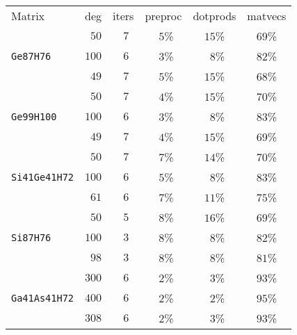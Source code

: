 \begin{tabular}{l|c|c|c|c|c}
\hline
\multirow{2}{*}{Matrix} & \multirow{2}{*}{deg} & \multirow{2}{*}{iters} & \multirow{2}{*}{preproc} & \multirow{2}{*}{dotprods} & \multirow{2}{*}{matvecs} \\
 & & & & & \\\hline
\hline
  & $\phantom{0}50$ & $\phantom{0}7$ & $\phantom{0}5$\% & $15$\% & $69$\%\\
\verb|Ge87H76| & $100$ & $\phantom{0}6$ & $\phantom{0}3$\% & $\phantom{0}8$\% & $82$\%\\
  & $\phantom{0}49$ & $\phantom{0}7$ & $\phantom{0}5$\% & $15$\% & $68$\%\\\hline
  & $\phantom{0}50$ & $\phantom{0}7$ & $\phantom{0}4$\% & $15$\% & $70$\%\\
\verb|Ge99H100| & $100$ & $\phantom{0}6$ & $\phantom{0}3$\% & $\phantom{0}8$\% & $83$\%\\
  & $\phantom{0}49$ & $\phantom{0}7$ & $\phantom{0}4$\% & $15$\% & $69$\%\\\hline
  & $\phantom{0}50$ & $\phantom{0}7$ & $\phantom{0}7$\% & $14$\% & $70$\%\\
\verb|Si41Ge41H72| & $100$ & $\phantom{0}6$ & $\phantom{0}5$\% & $\phantom{0}8$\% & $83$\%\\
  & $\phantom{0}61$ & $\phantom{0}6$ & $\phantom{0}7$\% & $11$\% & $75$\%\\\hline
  & $\phantom{0}50$ & $\phantom{0}5$ & $\phantom{0}8$\% & $16$\% & $69$\%\\
\verb|Si87H76| & $100$ & $\phantom{0}3$ & $\phantom{0}8$\% & $\phantom{0}8$\% & $82$\%\\
  & $\phantom{0}98$ & $\phantom{0}3$ & $\phantom{0}8$\% & $\phantom{0}8$\% & $81$\%\\\hline
  & $300$ & $\phantom{0}6$ & $\phantom{0}2$\% & $\phantom{0}3$\% & $93$\%\\
\verb|Ga41As41H72| & $400$ & $\phantom{0}6$ & $\phantom{0}2$\% & $\phantom{0}2$\% & $95$\%\\
  & $308$ & $\phantom{0}6$ & $\phantom{0}2$\% & $\phantom{0}3$\% & $93$\%\\\hline
\end{tabular}